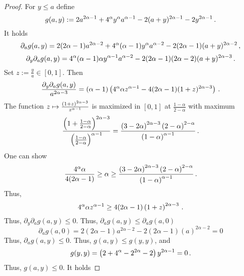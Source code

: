 \begin{proof}
	For $y\leq a$ define
	\begin{equation*}
		g(a,y) := 2a^{2\alpha-1} + 4^\alpha y^\alpha a^{\alpha-1} - 2(a+y)^{2\alpha-1} - 2y^{2\alpha-1}
		\, .
	\end{equation*}
	It holds
	\begin{equation*}
		\partial_a g(a,y) = 2(2\alpha-1)a^{2\alpha-2} + 4^\alpha(\alpha-1) y^\alpha a^{\alpha-2} - 2(2\alpha-1)(a+y)^{2\alpha-2}
		\, ,
	\end{equation*}
	\begin{equation*}
		\partial_y \partial_a g(a,y) = 4^\alpha (\alpha-1) \alpha y^{\alpha-1} a^{\alpha-2} - 2(2\alpha-1)(2\alpha-2)(a+y)^{2\alpha-3}
		\, .
	\end{equation*}
	Set $z := \frac{y}{a} \in[0,1]$. Then
	\begin{equation*}
	 \frac{\partial_y \partial_a g(a,y)}{a^{2\alpha-3}} =  (\alpha-1) \left( 4^\alpha \alpha z^{\alpha-1} - 4(2\alpha-1)(1+z)^{2\alpha-3} \right)
	 \, .
	\end{equation*}
	The function $z \mapsto \frac{\left( 1+z \right)^{2\alpha-3}}{z^{\alpha-1}}$ is maximized in $[0,1]$ at $\frac{1-\alpha}{2-\alpha}$ with maximum 
	\begin{equation*}
		\frac{\left( 1+\frac{1-\alpha}{2-\alpha} \right)^{2\alpha-3}}{\left( \frac{1-\alpha}{2-\alpha} \right)^{\alpha-1}}
		=
		\frac{\left( 3-2\alpha \right)^{2\alpha-3} \left( 2-\alpha \right)^{2-\alpha}}{\left( 1-\alpha \right)^{\alpha-1}} 
		\, .
	\end{equation*}
	One can show
	\begin{equation*}
		\frac{4^\alpha \alpha}{4(2\alpha-1)} \geq \alpha \geq \frac{\left( 3-2\alpha \right)^{2\alpha-3} \left( 2-\alpha \right)^{2-\alpha}}{\left( 1-\alpha \right)^{\alpha-1}} 
		\, .
	\end{equation*}
	Thus,
	\begin{equation*}
		4^\alpha \alpha z^{\alpha-1} \geq 4(2\alpha-1) \left( 1+z \right)^{2\alpha-3}
		\, .
	\end{equation*}
	Thus, $\partial_y \partial_a g(a,y) \leq 0$. Thus, $\partial_a g(a,y) \leq \partial_a g(a,0)$
	\begin{equation*}
		\partial_a  g(a,0) = 2(2\alpha-1)a^{2\alpha-2} - 2(2\alpha-1)(a)^{2\alpha-2} = 0
	\end{equation*}
	Thus, $\partial_a g(a,y) \leq 0$. Thus, $g(a,y) \leq g(y,y)$, and
	\begin{equation*}
		g(y,y) = \left( 2 + 4^\alpha - 2^{2\alpha} - 2 \right) y^{2\alpha-1} = 0
		\, .
	\end{equation*}
	Thus,  $g(a,y) \leq 0$. It holds

\end{proof}
